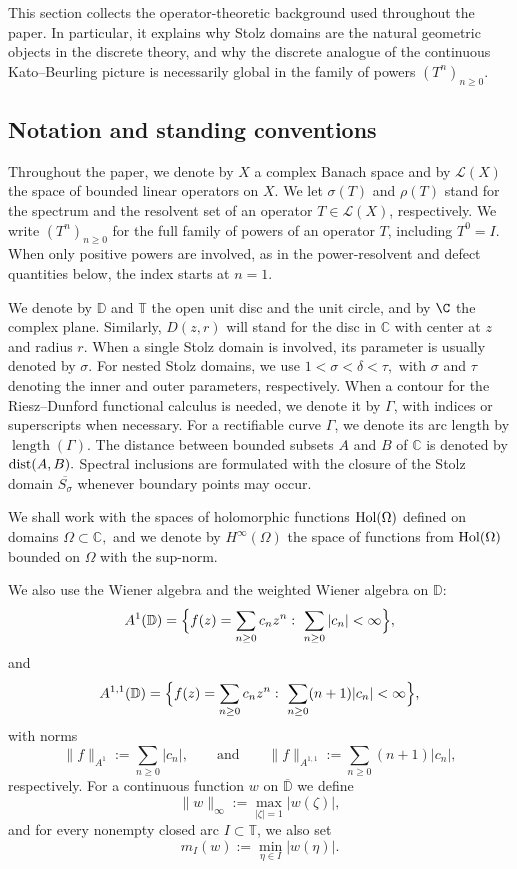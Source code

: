 \documentclass[11pt]{amsart}
\numberwithin{equation}{section}
\theoremstyle{definition}
\theoremstyle{plain}
\def\T{\mathbb{T}}
\def\L{L}
\def\D{\mathbb{D}}
\renewcommand{\L}{\mathcal L}
\begin{document}
This section collects the operator-theoretic background used thro\-ughout the
paper. In particular, it explains why Stolz domains are the natural geometric
objects in the discrete theory, and why the discrete analogue of the continuous
Kato--Beurling picture is necessarily global in the family of powers $(T^n)_{n \ge 0}$.

\subsection{Notation and standing conventions}\label{subsec:notation}

Throughout the paper,  we denote by $X$ a complex Banach space and by $\mathcal L(X)$
the space of bounded linear operators on $X.$
We let
$\sigma(T)$ and $\rho(T)$ stand for the spectrum and the resolvent set of an operator $T\in\L(X)$, respectively. 
We write $(T^n)_{n\ge0}$ for the full family of powers of an operator
$T$, including $T^0=I$.  When only positive powers are involved, as in
the power-resolvent and defect quantities below, the index starts at
$n=1$.

We denote by $\D$ and $\T$ the open unit disc and the unit circle, and by $\C$  the complex plane. Similarly, $D(z, r)$ will stand for the disc in $\mathbb C$ with center at $z$ and radius $r.$
When a single Stolz domain is involved, its parameter is usually
denoted by \(\sigma\). For nested Stolz domains, we use
\(
        1<\sigma<\delta<\tau,
\)
with \(\sigma\) and \(\tau\) denoting the inner and outer parameters,
respectively.
When a contour for the Riesz--Dunford functional calculus is needed,
we denote it by \(\Gamma\), with indices or superscripts when necessary.
For a rectifiable curve \(\Gamma\), we denote its arc length by
\(\operatorname{length}(\Gamma)\). The distance between bounded subsets $A$ and $B$ of $\mathbb C$ is denoted by ${\rm dist}(A, B).$
Spectral inclusions are formulated with the closure of the Stolz domain \(\overline{S_\sigma}\)
whenever boundary points may occur.


We shall work with the spaces of holomorphic functions ${\rm Hol}(\Omega)$ defined on domains $\Omega \subset \mathbb C,$ and we denote by 
$H^\infty(\Omega)$ the space of functions from ${\rm Hol}(\Omega)$ bounded
on $\Omega$ with the sup-norm.

We also use the Wiener algebra and the weighted Wiener algebra on $\mathbb D:$
\[
  A^1(\D)=\Bigl\{f(z)=\sum_{n\ge0}c_nz^n:\ \sum_{n\ge0}|c_n|<\infty\Bigr\},
\]
and
\[
  A^{1,1}(\D)=\Bigl\{f(z)=\sum_{n\ge0}c_nz^n:\ \sum_{n\ge0}(n+1)|c_n|<\infty\Bigr\},
\]
with norms
\[
  \|f\|_{A^1}:=\sum_{n\ge0}|c_n|,
  \qquad \text{and} \qquad
  \|f\|_{A^{1,1}}:=\sum_{n\ge0}(n+1)|c_n|,
\]
respectively. For a continuous function $w$ on $\overline{\mathbb D}$
we define
\[
  \|w\|_\infty:= \max_{|\zeta|=1} |w(\zeta)|,
\]
and for every nonempty closed arc \(I\subset\mathbb T\), we also set
\[
  m_I(w):=\min_{\eta\in I}|w(\eta)|.
\]
\end{document}
